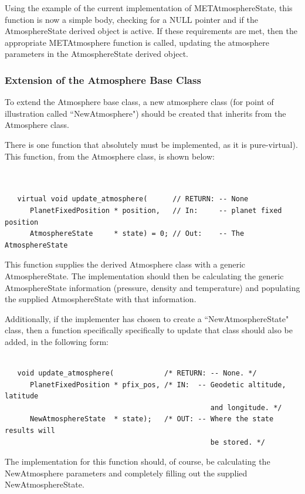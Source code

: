 Using the example of the current implementation of METAtmosphereState, this
function is now a simple body, checking for a NULL pointer and if the
AtmosphereState derived object is active. If these requirements are met, then
the appropriate METAtmosphere function is called, updating the atmosphere
parameters in the AtmosphereState derived object.

\subsubsection{Extension of the Atmosphere Base Class}

To extend the Atmosphere base class, a new atmosphere class (for point of
illustration called ``NewAtmosphere") should be created that inherits from
the Atmosphere class.

There is one function that absolutely must be implemented, as it is pure-virtual).
This function, from the Atmosphere class, is shown below:

\begin{verbatim}


   virtual void update_atmosphere(      // RETURN: -- None
      PlanetFixedPosition * position,   // In:     -- planet fixed position
      AtmosphereState     * state) = 0; // Out:    -- The AtmosphereState

\end{verbatim}

This function supplies the derived Atmosphere class with a generic AtmosphereState.
The implementation should then be calculating the generic AtmosphereState
information (pressure, density and temperature) and populating the supplied
AtmosphereState with that information.

Additionally, if the implementer has chosen to create a ``NewAtmosphereState"
class, then a function specifically specifically to update that class should
also be added, in the following form:

\begin{verbatim}

   void update_atmosphere(            /* RETURN: -- None. */
      PlanetFixedPosition * pfix_pos, /* IN:  -- Geodetic altitude, latitude
                                                 and longitude. */
      NewAtmosphereState  * state);   /* OUT: -- Where the state results will
                                                 be stored. */
\end{verbatim}

The implementation for this function should, of course, be calculating the
NewAtmosphere parameters and completely filling out the supplied
NewAtmosphereState.


